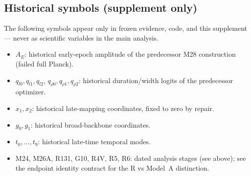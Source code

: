 \subsection{Historical symbols (supplement only)}

The following symbols appear only in frozen evidence, code, and this
supplement — never as scientific variables in the main analysis.

\begin{itemize}
\item $A_{E}$: historical early-epoch amplitude of the predecessor
  M28 construction (failed full Planck).
\item $q_{l0},q_{l1},q_{l2}$, $q_{\rho0},q_{\rho1},q_{\rho2}$:
  historical duration/width logits of the predecessor optimizer.
\item $x_{1},x_{2}$: historical late-mapping coordinates, fixed to
  zero by repair.
\item $g_{0},g_{1}$: historical broad-backbone coordinates.
\item $t_{0},\ldots,t_{9}$: historical late-time temporal modes.
\item M24, M26A, R131, G10, R4V, R5, R6: dated analysis stages (see
  above); see the endpoint identity contract for the R vs Model~A
  distinction.
\end{itemize}
